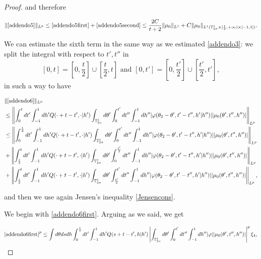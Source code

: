 \documentclass[a4paper,10pt,reqno]{amsart}
\numberwithin{equation}{subsection}
\numberwithin{figure}{subsection}
\begin{document}
\begin{proof}
and therefore

\begin{align*}
\|\eqref{addendo5}\|_{L^p}\leq\eqref{addendo5first}+\eqref{addendo5second}\leq \frac{2C}{t+2}\|\mu_0\|_{L^1}+C\|\mu_0\|_{L^1(\mathbb{T}^1_{2\pi}\times[\frac{t}{2},+\infty)\times[-1,1])}.
\end{align*}

We can estimate the sixth term in the same way as we estimated \eqref{addendo3}: we split the integral with respect to $t',t''$ in
\[
[0,t]=\left[0,\frac{t}{2}\right]\cup\left[\frac{t}{2},t\right]\textrm{ and }[0,t']=\left[0,\frac{t'}{2}\right]\cup\left[\frac{t'}{2},t'\right],
\]
in such a way to have

{\tiny\begin{align}
\nonumber&\|\eqref{addendo6}\|_{L^p}
\\
\nonumber&\leq\left\|\int_0^tdt'\int_{-1}^1dh'Q(\cdot+t-t',\cdot|h')\int_{\mathbb{T}^1_{2\pi}}d\theta'\int_0^{t'}dt''\int_{-1}^1dh''|\varphi(\theta_2-\theta',t'-t'',h'|h'')||\mu_0(\theta',t'',h'')|\right\|_{L^p}
\\
\label{addendo6first}&\leq\left\|\int_0^{\frac{t}{2}}dt'\int_{-1}^1dh'Q(\cdot+t-t',\cdot|h')\int_{\mathbb{T}^1_{2\pi}}d\theta'\int_0^{t'}dt''\int_{-1}^1dh''|\varphi(\theta_2-\theta',t'-t'',h'|h'')||\mu_0(\theta',t'',h'')|\right\|_{L^p}
\\
\label{addendo6second}&+\left\|\int_{\frac{t}{2}}^tdt'\int_{-1}^1dh'Q(\cdot+t-t',\cdot|h')\int_{\mathbb{T}^1_{2\pi}}d\theta'\int_0^{\frac{t'}{2}}dt''\int_{-1}^1dh''|\varphi(\theta_2-\theta',t'-t'',h'|h'')||\mu_0(\theta',t'',h'')|\right\|_{L^p}
\\
\label{addendo6third}&+\left\|\int_{\frac{t}{2}}^tdt'\int_{-1}^1dh'Q(\cdot+t-t',\cdot|h')\int_{\mathbb{T}^1_{2\pi}}d\theta'\int_{\frac{t'}{2}}^{t'}dt''\int_{-1}^1dh''|\varphi(\theta_2-\theta',t'-t'',h'|h'')||\mu_0(\theta',t'',h'')|\right\|_{L^p},
\end{align}}

and then we use again Jensen's inequality \eqref{Jensencons}.

We begin with \eqref{addendo6first}. Arguing as we said, we get

{\scriptsize\begin{align*}
\eqref{addendo6first}^p\leq\int d\theta dsdh\int_0^{\frac{t}{2}}dt'\int_{-1}^1dh'Q(s+t-t',h|h')\left|\int_{\mathbb{T}^1_{2\pi}}d\theta'\int_0^{t'}dt''\int_{-1}^1dh''|\varphi||\mu_0(\theta',t'',h'')|\right|^p\xi_4,
\end{align*}}


\end{proof}
\end{document}
